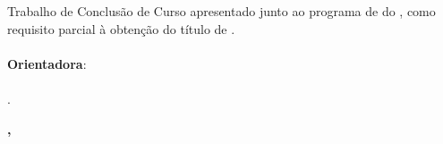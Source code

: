 %
%

\makeatletter
\begin{folhaderosto}
	\thispagestyle{empty}%
	
    \begin{center}
    
		\small\textbf{\expandafter\uppercase\expandafter{\imprimirnomeautor}}\\
		\vspace*{5.2 cm}%
		\normalsize\textbf{\expandafter\uppercase\expandafter{\imprimirtitulotb}}\\
		
    \end{center}
	
	\vspace*{2.35 cm}%
		    \large%
    		\hfill%
	    	\begin{minipage}{8 cm}%
	    		\begin{small} %
	    		\setlength{\baselineskip}{0.8\baselineskip}
				
				
		    	{Trabalho de Conclusão de Curso apresentado junto ao programa de {\textbf{\imprimirprograma}}
		    	do {\textbf{\imprimirinstituicao}},
		    	como requisito parcial à obtenção do título de
		    	{\textbf{\imprimirgrau}}.}\\{
		    	}\\\textbf{Orientadora}:\\ \\
		    	{\imprimirtitulacaoorientador }{ }{\imprimirorientador.}\\{
		    	}
				
				
				\end{small} %
		    \end{minipage}%
		    	
		    \vspace*{6.5 cm}%
		    
		    \begin{center} %
		    	\normalsize %
	    		\textbf{\imprimirlocalapresentacao, \imprimirdataapresentacao}
	    	\end{center}%

\end{folhaderosto}
\makeatother
